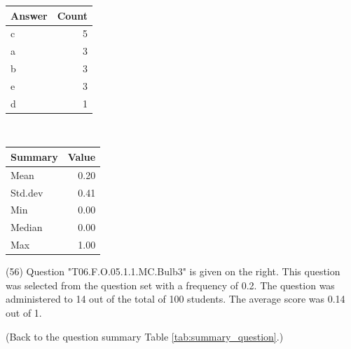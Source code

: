 \documentclass[12pt,nohyper]{tufte-handout}\usepackage[]{graphicx}\usepackage[]{color}
\begin{document}
\begin{center}%
\begin{tabular}{lr}
  \hline
Answer & Count \\ 
  \hline
c &   5 \\ 
  a &   3 \\ 
  b &   3 \\ 
  e &   3 \\ 
  d &   1 \\ 
   \hline
\end{tabular}
~~~~~~~~%
\begin{tabular}{lr}
  \hline
Summary & Value \\ 
  \hline
Mean & 0.20 \\ 
  Std.dev & 0.41 \\ 
  Min & 0.00 \\ 
  Median & 0.00 \\ 
  Max & 1.00 \\ 
   \hline
\end{tabular}
\end{center}\newpage{} (56) Question "T06.F.O.05.1.1.MC.Bulb3" is given on the right. This question was selected from the question set with a frequency of 0.2. The question was administered to 14 out of the total of 100 students. The average score was 0.14 out of 1.

 (Back to the question summary Table \ref{tab:summary_question}.)
\end{document}
